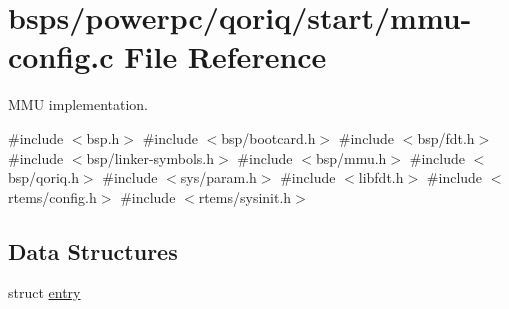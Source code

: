 \hypertarget{powerpc_2qoriq_2start_2mmu-config_8c}{}\section{bsps/powerpc/qoriq/start/mmu-\/config.c File Reference}
\label{powerpc_2qoriq_2start_2mmu-config_8c}


M\+MU implementation.  


{\ttfamily \#include $<$bsp.\+h$>$}\newline
{\ttfamily \#include $<$bsp/bootcard.\+h$>$}\newline
{\ttfamily \#include $<$bsp/fdt.\+h$>$}\newline
{\ttfamily \#include $<$bsp/linker-\/symbols.\+h$>$}\newline
{\ttfamily \#include $<$bsp/mmu.\+h$>$}\newline
{\ttfamily \#include $<$bsp/qoriq.\+h$>$}\newline
{\ttfamily \#include $<$sys/param.\+h$>$}\newline
{\ttfamily \#include $<$libfdt.\+h$>$}\newline
{\ttfamily \#include $<$rtems/config.\+h$>$}\newline
{\ttfamily \#include $<$rtems/sysinit.\+h$>$}\newline
\subsection*{Data Structures}
\begin{DoxyCompactItemize}
\item 
struct \mbox{\hyperlink{structentry}{entry}}
\end{DoxyCompactItemize}
